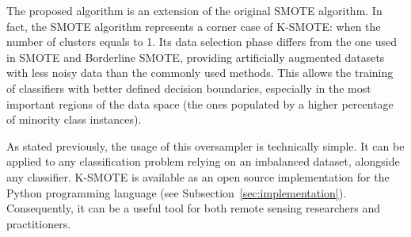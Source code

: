 \documentclass[parskip=full]{scrartcl}
\begin{document}
The proposed algorithm is an extension of the original SMOTE algorithm. In fact, the SMOTE algorithm
represents a corner case of K-SMOTE: when the number of clusters equals to 1. Its data selection
phase differs from the one used in SMOTE and Borderline SMOTE, providing artificially augmented
datasets with less noisy data than the commonly used methods. This allows the training of
classifiers with better defined decision boundaries, especially in the most important regions of the
data space (the ones populated by a higher percentage of minority class instances).

As stated previously, the usage of this oversampler is technically simple. It can be applied to any
classification problem relying on an imbalanced dataset, alongside any classifier. K-SMOTE is
available as an open source implementation for the Python programming language (see
Subsection~\ref{sec:implementation}). Consequently, it can be a useful tool for both remote sensing
researchers and practitioners.



\end{document}
